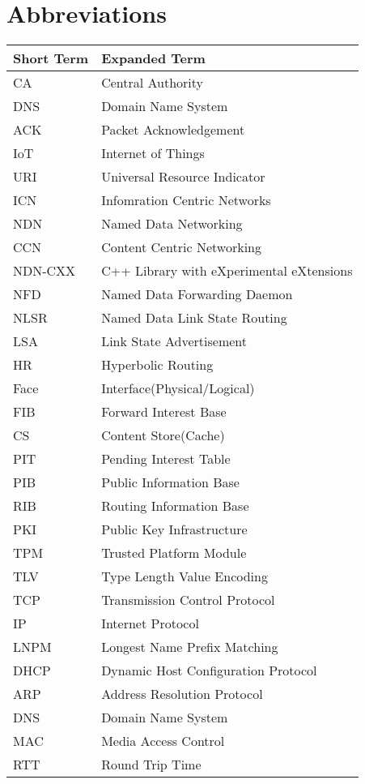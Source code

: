 \chapter{Abbreviations}

\begin{longtable}{p{40mm}|p{100mm}}
	\textbf{Short Term}&\textbf{Expanded Term}\\
	\hline
	CA & Central Authority\\
	DNS & Domain Name System\\
	ACK & Packet Acknowledgement \\ 
	IoT & Internet of Things \\  
	URI & Universal Resource Indicator \\  
	ICN & Infomration Centric Networks\\ 
	NDN & Named Data Networking \\ 
	CCN & Content Centric Networking\\ 
	NDN-CXX & C++ Library with eXperimental eXtensions \\ 
	NFD & Named Data Forwarding Daemon \\ 
	NLSR & Named Data Link State Routing \\ 
	LSA & Link State Advertisement \\ 
	HR & Hyperbolic Routing \\  
	Face & Interface(Physical/Logical)\\ 
	FIB & Forward Interest Base \\ 
	CS & Content Store(Cache) \\ 
	PIT & Pending Interest Table \\ 
	PIB & Public Information Base \\ 
	RIB & Routing Information Base \\ 
	PKI & Public Key Infrastructure \\ 
	TPM & Trusted Platform Module \\ 
	TLV & Type Length Value Encoding \\ 
	TCP & Transmission Control Protocol \\ 
	IP & Internet Protocol  \\ 
	LNPM & Longest Name Prefix Matching \\
	DHCP & Dynamic Host Configuration Protocol \\ 
	ARP & Address Resolution Protocol \\ 
	DNS & Domain Name System \\ 
	MAC & Media Access Control \\ 
	RTT & Round Trip Time \\ 
\end{longtable}
